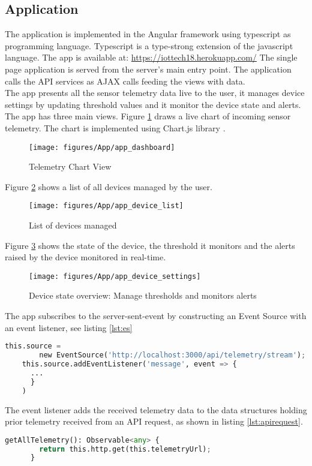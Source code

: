 \subsection{Application}
The application is implemented in the Angular framework using typescript as programming language. Typescript is a type-strong extension of the javascript language. The app is available at: \href{https://iottech18.herokuapp.com/}{https://iottech18.herokuapp.com/} The single page application is served from the server's main entry point. The application calls the API services as AJAX calls feeding the views with data. \\

The app presents all the sensor telemetry data live to the user, it manages device settings by updating threshold values and it monitor the device state and alerts. The app has three main views.
Figure \ref{fig:chartview} draws a live chart of incoming sensor telemetry. The chart is implemented using Chart.js library \cite{chart}.

\begin{figure}[H]
    \centering
    \texttt{[image: figures/App/app\_dashboard]}
    \caption{Telemetry Chart View}
    \label{fig:chartview}
\end{figure}

Figure \ref{fig:devicelist} shows a list of all devices managed by the user. 

\begin{figure}[H]
    \centering
    \texttt{[image: figures/App/app\_device\_list]}
    \caption{List of devices managed}
    \label{fig:devicelist}
\end{figure}

Figure \ref{fig:deviceoverview} shows the state of the device, the threshold it monitors and the alerts raised by the device monitored in real-time.

\begin{figure}[H]
    \centering
    \texttt{[image: figures/App/app\_device\_settings]}
    \caption{Device state overview: Manage thresholds and monitors alerts}
    \label{fig:deviceoverview}
\end{figure}

The app subscribes to the server-sent-event by constructing an Event Source with an event listener, see listing \ref{lst:es}

\begin{lstlisting}[language=Python, caption=Event Source, label={lst:es}]
    this.source = 
        new EventSource('http://localhost:3000/api/telemetry/stream');
    this.source.addEventListener('message', event => {
      ...
      }
    )
\end{lstlisting}

The event listener adds the received telemetry data to the data structures holding prior telemetry received from an API request, as shown in listing \ref{lst:apirequest}. 


\begin{lstlisting}[language=Python, caption=API Request, label={lst:apirequest}]
    getAllTelemetry(): Observable<any> {
        return this.http.get(this.telemetryUrl);
      }
\end{lstlisting}